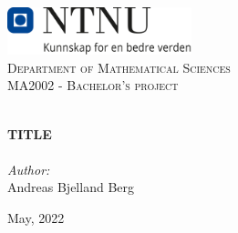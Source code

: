 
\begin{titlepage}
\vbox{ }
\vbox{ }
\begin{center}
\includegraphics[width=0.40\textwidth]{Images/NTNU_logo.png}\\[1cm]
\textsc{\LARGE Department of Mathematical Sciences}\\[1.5cm]
\textsc{\Large MA2002 - Bachelor's project}\\[0.5cm]
\vbox{ }

\HRule \\[0.4cm]
{ \huge \bfseries \color{red}TITLE}\\[0.4cm]
\HRule \\[1.5cm]

\large
\emph{Author:}\\
Andreas Bjelland Berg
\vfill

{\large May, 2022}
\end{center}
\end{titlepage}